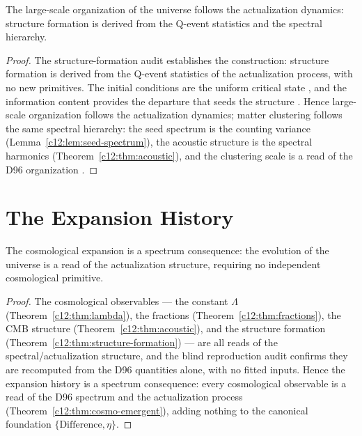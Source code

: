\begin{theorem}
\label{c12:thm:structure-formation}
The large-scale organization of the universe follows the actualization dynamics: structure
formation is derived from the Q-event statistics and the spectral hierarchy.
\end{theorem}

\begin{proof}
The structure-formation audit \cite{c12:QG231} establishes the construction: structure
formation is derived from the Q-event statistics of the actualization process, with no new
primitives. The initial conditions are the uniform critical state \cite{c12:QG227}, and the
information content provides the departure that seeds the structure \cite{c12:QG228}. Hence
large-scale organization follows the actualization dynamics; matter clustering follows the
same spectral hierarchy: the seed spectrum is the counting variance
(Lemma~\ref{c12:lem:seed-spectrum}), the acoustic structure is the spectral harmonics
(Theorem~\ref{c12:thm:acoustic}), and the clustering scale is a read of the D96
organization \cite{c12:QG231,c12:QG238}.
\end{proof}

\section{The Expansion History}
\label{c12:sec:expansion}

\begin{theorem}
\label{c12:thm:expansion}
The cosmological expansion is a spectrum consequence: the evolution of the universe is a
read of the actualization structure, requiring no independent cosmological primitive.
\end{theorem}

\begin{proof}
The cosmological observables --- the constant $\Lambda$ (Theorem~\ref{c12:thm:lambda}), the
fractions (Theorem~\ref{c12:thm:fractions}), the CMB structure (Theorem~\ref{c12:thm:acoustic}),
and the structure formation (Theorem~\ref{c12:thm:structure-formation}) --- are all reads of
the spectral/actualization structure, and the blind reproduction audit \cite{c12:QG240}
confirms they are recomputed from the D96 quantities alone, with no fitted inputs. Hence the
expansion history is a spectrum consequence: every cosmological observable is a read of the
D96 spectrum and the actualization process (Theorem~\ref{c12:thm:cosmo-emergent}), adding
nothing to the canonical foundation $\{\text{Difference},\eta\}$.
\end{proof}

